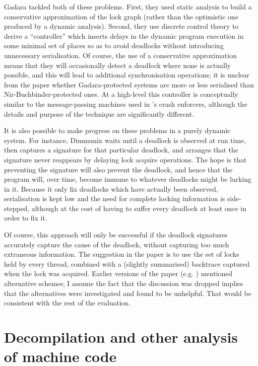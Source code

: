 Gadara\cite{Wang2008} tackled both of these problems.  First, they
used static analysis to build a conservative approximation of the lock
graph (rather than the optimistic one produced by a dynamic analysis).
Second, they use discrete control theory to derive a ``controller''
which inserts delays in the dynamic program execution in some minimal
set of places so as to avoid deadlocks without introducing unnecessary
serialisation.  Of course, the use of a conservative approximation
means that they will occasionally detect a deadlock where none is
actually possible, and this will lead to additional synchronisation
operations; it is unclear from the paper whether Gadara-protected
systems are more or less serialised than Nir-Buchbinder-protected
ones.  At a high-level this controller is conceptually similar to the
message-passing machines used in {\technique}'s crash enforcers,
although the details and purpose of the technique are significantly
different.

It is also possible to make progress on these problems in a purely
dynamic system.  For instance, Dimmunix\cite{Jula2008} waits until a
deadlock is observed at run time, then captures a signature for that
particular deadlock, and arranges that the signature never reappears
by delaying lock acquire operations.  The hope is that preventing the
signature will also prevent the deadlock, and hence that the program
will, over time, become immune to whatever deadlocks might be lurking
in it.  Because it only fix deadlocks which have actually been
observed, serialisation is kept low and the need for complete locking
information is side-stepped, although at the cost of having to suffer
every deadlock at least once in order to fix it.

Of course, this approach will only be successful if the deadlock
signatures accurately capture the cause of the deadlock, without
capturing too much extraneous information.  The suggestion in the
paper is to use the set of locks held by every thread, combined with a
(slightly summarised) backtrace captured when the lock was acquired.
Earlier versions of the paper (e.g. \cite{Jula2008b}) mentioned
alternative schemes; I assume the fact that the discussion was dropped
implies that the alternatives were investigated and found to be
unhelpful.  That would be consistent with the rest of the evaluation.



\section{Decompilation and other analysis of machine code}

